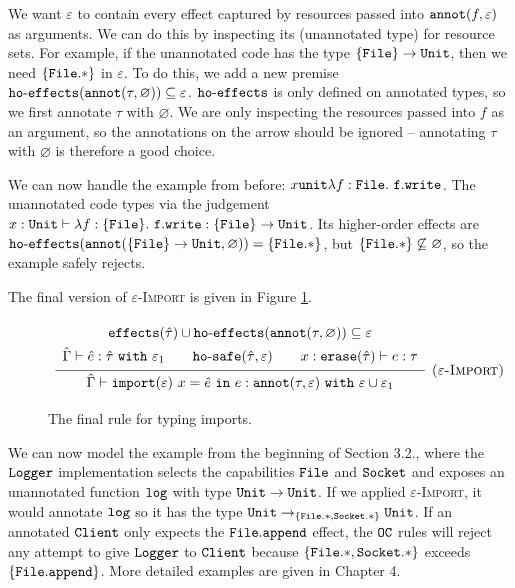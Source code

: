 We want $\varepsilon$ to contain every effect captured by resources passed into $\mathtt{annot}(f, \varepsilon)$ as arguments. We can do this by inspecting its (unannotated type) for resource sets. For example, if the unannotated code has the type $\mathtt{ \{ File \} \rightarrow \mathtt{Unit}}$, then we need $\mathtt{ \{ File.* \} }$ in $\varepsilon$. To do this, we add a new premise $\mathtt{ho \hbox{-} effects}(\mathtt{annot}(\tau, \varnothing)) \subseteq \varepsilon$. $\mathtt{ho \hbox{-} effects}$ is only defined on annotated types, so we first annotate $\tau$ with $\varnothing$. We are only inspecting the resources passed into $f$ as an argument, so the annotations on the arrow should be ignored -- annotating $\tau$ with $\varnothing$ is therefore a good choice.

We can now handle the example from before: ${x}{\mathtt{unit}}{\lambda f: { \mathtt{File} }.~\mathtt{f.write}}$. The unannotated code types via the judgement $x: \mathtt{Unit} \vdash \lambda f: \{ \mathtt{File} \}.~\mathtt{f.write}: \{ \mathtt{File} \} \rightarrow \mathtt{Unit}$. Its higher-order effects are $\mathtt{ho \hbox{-} effects}(\mathtt{annot}( \{ \mathtt{File} \} \rightarrow \mathtt{Unit}, \varnothing)) = \{ \mathtt{File.*} \}$, but $\{ \mathtt{File.*} \} \not\subseteq \varnothing$, so the example safely rejects.

The final version of \textsc{$\varepsilon$-Import} is given in Figure \ref{fig:import_rule}.

\begin{figure}[h]

\[
\begin{array}{c}

\infer[\textsc{($\varepsilon$-Import)}]
	{ \hat \Gamma \vdash \kwa{import}(\varepsilon)~x = \hat e~\kw{in} e: \kwa{annot}(\tau, \varepsilon)~\kw{with} \varepsilon \cup \varepsilon_1 }
{{\def\arraystretch{1.4}
  \begin{array}{c}
\kwa{effects}(\hat \tau) \cup \hofx{\annot{\tau}{\varnothing}}\subseteq \varepsilon \\
\hat \Gamma \vdash \hat e: \hat \tau~\kw{with} \varepsilon_1 ~~~~~~ \kwa{ho \hyphen safe}(\hat \tau, \varepsilon) ~~~~~~ x: \kwa{erase}(\hat \tau) \vdash e: \tau
  \end{array}}} 
 
\end{array}
\]


\vspace{-7pt}
\caption{The final rule for typing imports.}
\label{fig:import_rule}
\end{figure}

We can now model the example from the beginning of Section 3.2., where the $\mathtt{Logger}$ implementation selects the capabilities $\mathtt{File}$ and $\mathtt{Socket}$ and exposes an unannotated function $\mathtt{log}$ with type $\mathtt{Unit} \rightarrow \mathtt{Unit}$. If we applied \textsc{$\varepsilon$-Import}, it would annotate $\mathtt{log}$ so it has the type $\mathtt{Unit} \rightarrow_{ \{ \mathtt{File.*, Socket.*} \} } \mathtt{Unit}$. If an annotated $\mathtt{Client}$ only expects the $\mathtt{File.append}$ effect, the $\mathtt{OC}$ rules will reject any attempt to give $\mathtt{Logger}$ to $\mathtt{Client}$ because $\mathtt{ \{ File.*, Socket.* \} }$ exceeds $ \mathtt{ \{File.append  \}}$. More detailed examples are given in Chapter 4.\\

